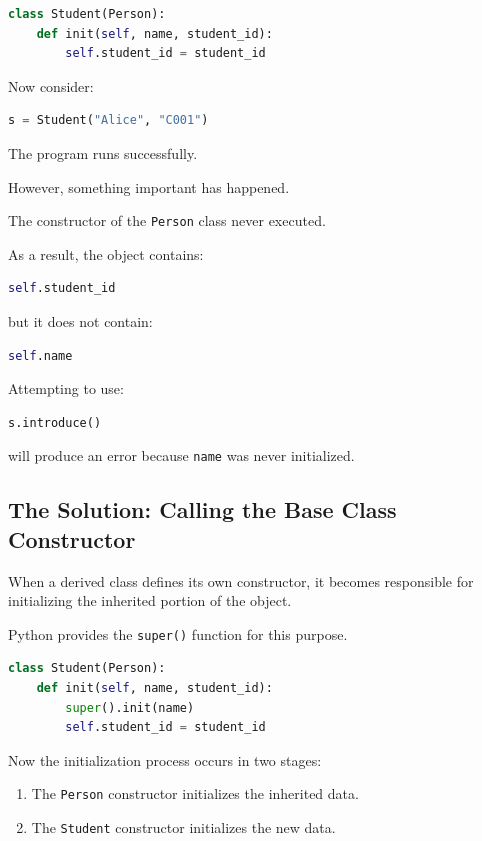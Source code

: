 \documentclass[11pt]{article}
\begin{document}
\begin{lstlisting}[language=Python]
class Student(Person):
    def init(self, name, student_id):
        self.student_id = student_id
\end{lstlisting}

Now consider:

\begin{lstlisting}[language=Python]
s = Student("Alice", "C001")
\end{lstlisting}

The program runs successfully.

However, something important has happened.

The constructor of the \texttt{Person} class never executed.

As a result, the object contains:

\begin{lstlisting}[language=Python]
self.student_id
\end{lstlisting}

but it does not contain:

\begin{lstlisting}[language=Python]
self.name
\end{lstlisting}

Attempting to use:

\begin{lstlisting}[language=Python]
s.introduce()
\end{lstlisting}

will produce an error because \texttt{name} was never initialized.

\subsection{The Solution: Calling the Base Class Constructor}

When a derived class defines its own constructor, it becomes responsible for initializing the inherited portion of the object.

Python provides the \texttt{super()} function for this purpose.

\begin{lstlisting}[language=Python]
class Student(Person):
    def init(self, name, student_id):
        super().init(name)
        self.student_id = student_id
\end{lstlisting}

Now the initialization process occurs in two stages:

\begin{enumerate}
\item The \texttt{Person} constructor initializes the inherited data.
\item The \texttt{Student} constructor initializes the new data.
\end{enumerate}
\end{document}
